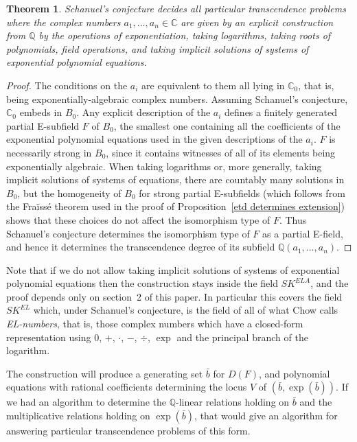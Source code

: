 \documentclass[12pt]{amsart}
\newtheorem{theorem}[prop]{Theorem}
\theoremstyle{definition}
\begin{document}
\begin{theorem}\label{td problems}
Schanuel's conjecture decides all particular transcendence problems where the complex numbers $a_1,\ldots,a_n \in {\ensuremath{\mathbb{C}}}$ are given by an explicit construction from ${\ensuremath{\mathbb{Q}}}$ by the operations of exponentiation, taking logarithms, taking roots of polynomials, field operations, and taking implicit solutions of systems of exponential polynomial equations.
\end{theorem}
\begin{proof}
The conditions on the $a_i$ are equivalent to them all lying in ${\ensuremath{\mathbb{C}}}_0$, that is, being exponentially-algebraic complex numbers. Assuming Schanuel's conjecture, ${\ensuremath{\mathbb{C}}}_0$ embeds in $B_0$. Any explicit description of the $a_i$ defines a finitely generated partial E-subfield $F$ of $B_0$, the smallest one containing all the coefficients of the exponential polynomial equations used in the given descriptions of the $a_i$. $F$ is necessarily strong in $B_0$, since it contains witnesses of all of its elements being exponentially algebraic. When taking logarithms or, more generally, taking implicit solutions of systems of equations, there are countably many solutions in $B_0$, but the homogeneity of $B_0$ for strong partial E-subfields (which follows from the Fra\"iss\'e theorem used in the proof of Proposition~\ref{etd determines extension}) shows that these choices do not affect the isomorphism type of $F$. Thus Schanuel's conjecture determines the isomorphism type of $F$ as a partial E-field, and hence it determines the transcendence degree of its subfield ${\ensuremath{\mathbb{Q}}}(a_1,\ldots,a_n)$.
\end{proof}

Note that if we do not allow taking implicit solutions of systems of exponential polynomial equations then the construction stays inside the field $SK^{ELA}$, and the proof depends only on section~2 of this paper. In particular this covers the field $SK^{EL}$ which, under Schanuel's conjecture, is the field of all of what Chow \cite{Chow99} calls \emph{EL-numbers}, that is, those complex numbers which have a closed-form representation using $0$, $+$, $\cdot$, $-$, $\div$, $\exp$ and the principal branch of the logarithm.

The construction will produce a generating set ${{\ensuremath{\bar{b}}}}$ for $D(F)$, and polynomial equations with rational coefficients determining the locus $V$ of $({{\ensuremath{\bar{b}}}},\exp({{\ensuremath{\bar{b}}}}))$. If we had an algorithm to determine the ${\ensuremath{\mathbb{Q}}}$-linear relations holding on ${{\ensuremath{\bar{b}}}}$ and the multiplicative relations holding on $\exp({{\ensuremath{\bar{b}}}})$, that would give an algorithm for answering particular transcendence problems of this form.
\end{document}
